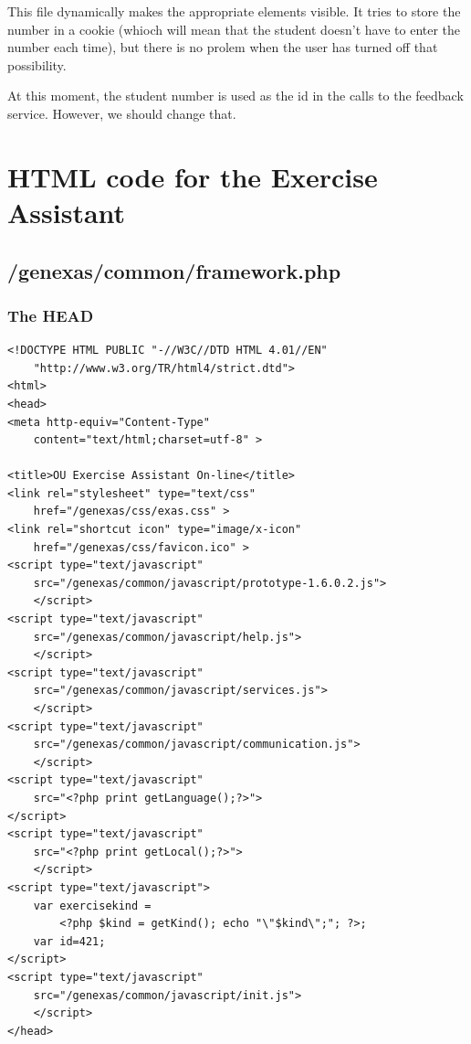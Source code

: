 \documentclass{article}
\begin{document}
This file dynamically makes the appropriate elements visible. It tries to store the number in a cookie (whioch will mean that the student doesn't have to enter the number each time), but there is no prolem when the user has turned off that possibility.

At this moment, the student number is used as the id in the calls to the feedback service. However, we should change that.





\appendix
\section{HTML code for the Exercise Assistant}
\subsection{/genexas/common/framework.php}\label{appendix:framework}
\subsubsection{The HEAD}
\begin{verbatim}
<!DOCTYPE HTML PUBLIC "-//W3C//DTD HTML 4.01//EN"
    "http://www.w3.org/TR/html4/strict.dtd">
<html>
<head>
<meta http-equiv="Content-Type" 
    content="text/html;charset=utf-8" >

<title>OU Exercise Assistant On-line</title>
<link rel="stylesheet" type="text/css" 
    href="/genexas/css/exas.css" >
<link rel="shortcut icon" type="image/x-icon" 
    href="/genexas/css/favicon.ico" >
<script type="text/javascript" 
    src="/genexas/common/javascript/prototype-1.6.0.2.js">
    </script> 
<script type="text/javascript" 
    src="/genexas/common/javascript/help.js">
    </script>
<script type="text/javascript" 
    src="/genexas/common/javascript/services.js">
    </script>
<script type="text/javascript" 
    src="/genexas/common/javascript/communication.js">
    </script>
<script type="text/javascript" 
    src="<?php print getLanguage();?>">
</script>
<script type="text/javascript" 
    src="<?php print getLocal();?>">
    </script>
<script type="text/javascript">
    var exercisekind = 
        <?php $kind = getKind(); echo "\"$kind\";"; ?>; 
    var id=421;
</script>
<script type="text/javascript" 
    src="/genexas/common/javascript/init.js">
    </script>
</head>
\end{verbatim}
\end{document}
